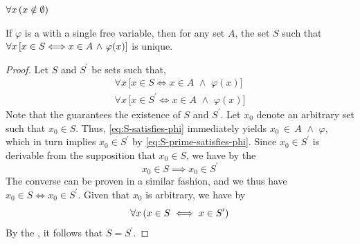 \begin{dfn}
     \label{dfn:empty-set}
    \( \forall x \, \mleft( x \notin \emptyset \mright) \)
\end{dfn}

\begin{thm}
    \label{thm:uniqueness-predicate-set}
    If \( \varphi \) is a  with a single free variable,
    then for any set \( A \), the set \( S \) such that \( \forall x \, \mleft[ x \in S {\iff} x \in A \,\,{\land}\,\, \varphi(x) \mright] \) is unique.
\end{thm}

\begin{proof}
    Let \( S \) and \( S^{\prime} \) be sets such that,
    \begin{gather}
        \forall x \, \big[ x \in S \iff x \in A \,\,{\land}\,\, \varphi(x) \big] \label{eq:S-satisfies-phi} \\
        \forall x \, \big[ x \in S^{\prime} \iff x \in A \,\,{\land}\,\, \varphi(x) \big] \label{eq:S-prime-satisfies-phi}
    \end{gather}
    Note that the  guarantees the existence of \( S \) and \( S^{\prime} \).
    Let \( x_{0} \) denote an arbitrary set such that \( x_{0} \in S \).
    Thus,  \eqref{eq:S-satisfies-phi} immediately
    yields \( x_{0} \,{\in}\, A \,\,{\land}\,\, \varphi \), which in turn implies \( x_{0} \in S^{\prime} \) by \eqref{eq:S-prime-satisfies-phi}.
    Since \( x_{0} \in S^{\prime} \) is derivable from the supposition that \( x_{0} \in S \), we have by the 
    \begin{equation*}
        x_{0} \in S {\implies} x_{0} \in S^{\prime}
    \end{equation*}
    The converse can be proven in a similar fashion, and we thus have \( x_{0} \in S {\iff} x_{0} \in S^{\prime} \).
    Given that \( x_{0} \) is arbitrary, we have by 
    \begin{equation*}
        \forall x \, \mleft( x \in S \iff x \in S^{\prime} \mright)
    \end{equation*}
    By the , it follows that \( S = S^{\prime} \).
\end{proof}

